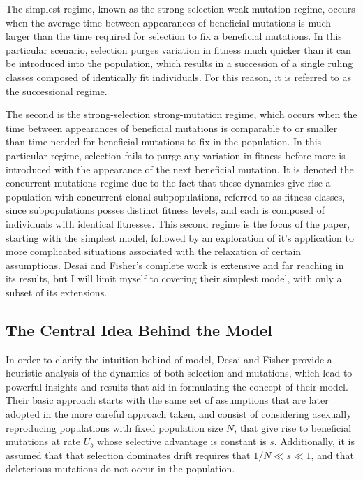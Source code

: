 \documentclass[12pt]{article}
\begin{document}
The simplest regime, known as the strong-selection weak-mutation regime, occurs when the average time between appearances of beneficial mutations is much larger than the time required for selection to fix a beneficial mutations.  In this particular scenario, selection purges variation in fitness much quicker than it can be introduced into the population, which results in a succession of a single ruling classes composed of identically fit individuals.  For this reason, it is referred to as the successional regime.  

The second is the strong-selection strong-mutation regime, which occurs when the time between appearances of beneficial mutations is comparable to or smaller than time needed for beneficial mutations to fix in the population.  In this particular regime, selection fails to purge any variation in fitness before more is introduced with the appearance of the next beneficial mutation.  It is denoted the concurrent mutations regime due to the fact that these dynamics give rise a population with concurrent clonal subpopulations, referred to as fitness classes, since subpopulations posses distinct fitness levels, and each is composed of individuals with identical fitnesses.  This second regime is the focus of the paper, starting with the simplest model, followed by an exploration of it's application to more complicated situations associated with the relaxation of certain assumptions.  Desai and Fisher's complete work is extensive and far reaching in its results, but I will limit myself to covering their simplest model, with only a subset of its extensions. 

\subsection*{The Central Idea Behind the Model}
In order to clarify the intuition behind of model, Desai and Fisher provide a heuristic analysis of the dynamics of both selection and mutations, which lead to powerful insights and results that aid in formulating the concept of their model.  Their basic approach starts with the same set of assumptions that are later adopted in the more careful approach taken, and consist of considering asexually reproducing populations with fixed population size $N$, that give rise to beneficial mutations at rate $U_b$ whose selective advantage is constant is $s$.  Additionally, it is assumed that that selection dominates drift requires that $1/N \ll s \ll 1$, and that deleterious mutations do not occur in the population. 
\end{document}
